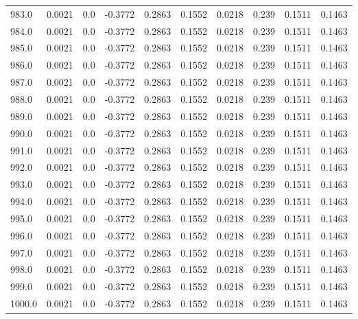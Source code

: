 \begin{longtable}{lrrrrrrrrr}
983.0 & 0.0021 & 0.0 & -0.3772 & 0.2863 & 0.1552 & 0.0218 & 0.239 & 0.1511 & 0.1463 \\
984.0 & 0.0021 & 0.0 & -0.3772 & 0.2863 & 0.1552 & 0.0218 & 0.239 & 0.1511 & 0.1463 \\
985.0 & 0.0021 & 0.0 & -0.3772 & 0.2863 & 0.1552 & 0.0218 & 0.239 & 0.1511 & 0.1463 \\
986.0 & 0.0021 & 0.0 & -0.3772 & 0.2863 & 0.1552 & 0.0218 & 0.239 & 0.1511 & 0.1463 \\
987.0 & 0.0021 & 0.0 & -0.3772 & 0.2863 & 0.1552 & 0.0218 & 0.239 & 0.1511 & 0.1463 \\
988.0 & 0.0021 & 0.0 & -0.3772 & 0.2863 & 0.1552 & 0.0218 & 0.239 & 0.1511 & 0.1463 \\
989.0 & 0.0021 & 0.0 & -0.3772 & 0.2863 & 0.1552 & 0.0218 & 0.239 & 0.1511 & 0.1463 \\
990.0 & 0.0021 & 0.0 & -0.3772 & 0.2863 & 0.1552 & 0.0218 & 0.239 & 0.1511 & 0.1463 \\
991.0 & 0.0021 & 0.0 & -0.3772 & 0.2863 & 0.1552 & 0.0218 & 0.239 & 0.1511 & 0.1463 \\
992.0 & 0.0021 & 0.0 & -0.3772 & 0.2863 & 0.1552 & 0.0218 & 0.239 & 0.1511 & 0.1463 \\
993.0 & 0.0021 & 0.0 & -0.3772 & 0.2863 & 0.1552 & 0.0218 & 0.239 & 0.1511 & 0.1463 \\
994.0 & 0.0021 & 0.0 & -0.3772 & 0.2863 & 0.1552 & 0.0218 & 0.239 & 0.1511 & 0.1463 \\
995.0 & 0.0021 & 0.0 & -0.3772 & 0.2863 & 0.1552 & 0.0218 & 0.239 & 0.1511 & 0.1463 \\
996.0 & 0.0021 & 0.0 & -0.3772 & 0.2863 & 0.1552 & 0.0218 & 0.239 & 0.1511 & 0.1463 \\
997.0 & 0.0021 & 0.0 & -0.3772 & 0.2863 & 0.1552 & 0.0218 & 0.239 & 0.1511 & 0.1463 \\
998.0 & 0.0021 & 0.0 & -0.3772 & 0.2863 & 0.1552 & 0.0218 & 0.239 & 0.1511 & 0.1463 \\
999.0 & 0.0021 & 0.0 & -0.3772 & 0.2863 & 0.1552 & 0.0218 & 0.239 & 0.1511 & 0.1463 \\
1000.0 & 0.0021 & 0.0 & -0.3772 & 0.2863 & 0.1552 & 0.0218 & 0.239 & 0.1511 & 0.1463 \\
\end{longtable}